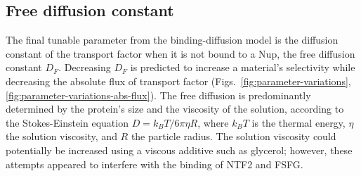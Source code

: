 



\subsection{Free diffusion constant}

The final tunable parameter from the binding-diffusion model is the diffusion constant of the transport factor when it is not bound to a Nup, the free diffusion constant $D_F$.  Decreasing $D_F$ is predicted to increase a material's selectivity while decreasing the absolute flux of transport factor (Figs.~\ref{fig:parameter-variations}, \ref{fig:parameter-variations-abs-flux}).  The free diffusion is predominantly determined by the protein's size and the viscosity of the solution, according to the Stokes-Einstein equation $D = k_BT/6\pi\eta R$, where $k_BT$ is the thermal energy, $\eta$ the solution viscosity, and $R$ the particle radius.  The solution viscosity could potentially be increased using a viscous additive such as glycerol; however, these attempts appeared to interfere with the binding of NTF2 and FSFG.

